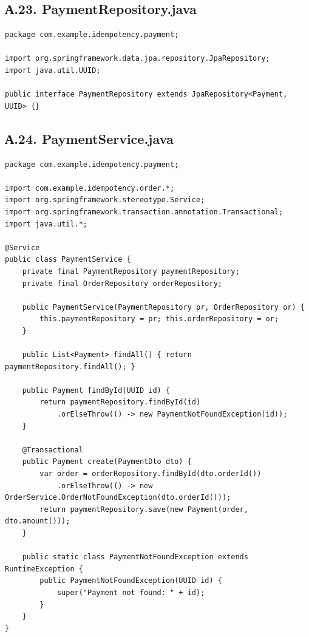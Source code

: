 \subsection*{А.23. PaymentRepository.java}
\begin{lstlisting}[caption={PaymentRepository.java}]
package com.example.idempotency.payment;

import org.springframework.data.jpa.repository.JpaRepository;
import java.util.UUID;

public interface PaymentRepository extends JpaRepository<Payment, UUID> {}
\end{lstlisting}

\subsection*{А.24. PaymentService.java}
\begin{lstlisting}[caption={PaymentService.java --- бизнес-логика платежей}]
package com.example.idempotency.payment;

import com.example.idempotency.order.*;
import org.springframework.stereotype.Service;
import org.springframework.transaction.annotation.Transactional;
import java.util.*;

@Service
public class PaymentService {
    private final PaymentRepository paymentRepository;
    private final OrderRepository orderRepository;

    public PaymentService(PaymentRepository pr, OrderRepository or) {
        this.paymentRepository = pr; this.orderRepository = or;
    }

    public List<Payment> findAll() { return paymentRepository.findAll(); }

    public Payment findById(UUID id) {
        return paymentRepository.findById(id)
            .orElseThrow(() -> new PaymentNotFoundException(id));
    }

    @Transactional
    public Payment create(PaymentDto dto) {
        var order = orderRepository.findById(dto.orderId())
            .orElseThrow(() -> new OrderService.OrderNotFoundException(dto.orderId()));
        return paymentRepository.save(new Payment(order, dto.amount()));
    }

    public static class PaymentNotFoundException extends RuntimeException {
        public PaymentNotFoundException(UUID id) {
            super("Payment not found: " + id);
        }
    }
}
\end{lstlisting}


